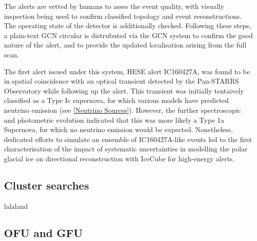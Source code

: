 The alerts are vetted by humans to asses the event quality, with visually inspection being used to confirm classified topology and event reconstructions. The operating state of the detector is additionally checked. Following these steps, a plain-text GCN circular is distrubuted via the GCN system to confirm the good nature of the alert, and to provide the updated localisation arising from the full scan. 

The first alert issued under this system, HESE alert IC160427A, was found to be in spatial coincidence with an optical transient detected by the Pan-STARRS Observatory while following up the alert. This transient was initially tentaively classified as a Type Ic supernova, for which various models have predicted neutrino emission (see \ref{Neutrino Sources}).  However, the further spectroscopic and photometric evolution indicated that this was  more likely a Type 1a Supernova, for which no neutrino emission would be expected. Nonetheless, dedicated efforts to simulate an ensemble of IC160427A-like events led to the first characterisation of the impact of systematic uncertainties in modelling the polar glacial ice on directional reconstruction with IceCube for high-energy alerts. 

\subsection{Cluster searches}
lalaland

\subsection{OFU and GFU}